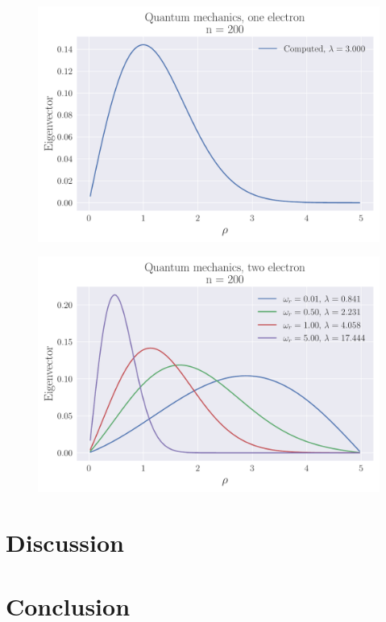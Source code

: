 \documentclass[reprint,english,notitlepage,nofootinbib]{revtex4-1}  %
\begin{document}
\begin{figure}[h]
	\centering
	\includegraphics[width=\linewidth]{../output/QM1_200_0.pdf}
	\label{fig:QM200}
	\caption{}
\end{figure}


\begin{figure}[h]
	\centering
	\includegraphics[width=\linewidth]{../output/QM2_200.pdf}
	\label{fig:QM2002}
	\caption{}
\end{figure}

\section{Discussion}

\section{Conclusion}
\end{document}
